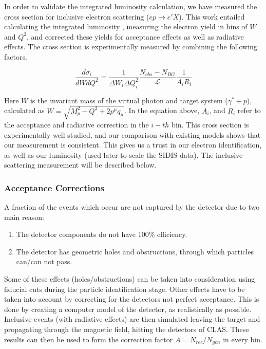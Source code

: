 In order to validate the integrated luminosity calculation, we have measured the cross section for inclusive electron scattering ($ep \rightarrow e'X$).  This work entailed calculating the integrated luminosity \cite{fcup-note}, measuring the electron yield in bins of $W$ and $Q^2$, and corrected these yields for acceptance effects as well as radiative effects.  The cross section is experimentally measured by combining the following factors. 

\begin{equation}
  \frac{d\sigma_i}{dW dQ^2} = \frac{1}{\Delta W_i \Delta Q^2_i} \frac{N_{obs} - N_{BG}}{\mathcal{L}} \frac{1}{A_i R_i}
\end{equation}

Here $W$ is the invariant mass of the virtual photon and target system ($\gamma^* + p$), calculated as $W = \sqrt{M_{p}^{2} - Q^2 + 2{p^\mu} q_{\mu}}$.  In the equation above, $A_i$, and $R_i$ refer to the acceptance and radiative correction in the $i-th$ bin.  This cross section is experimentally well studied, and our comparison with existing models shows that our measurement is consistent.  This gives us a trust in our electron identification, as well as our luminosity (used later to scale the SIDIS data).  The inclusive scattering measurement will be described below.

\subsubsection{Acceptance Corrections}
A fraction of the events which occur are not captured by the detector due to two main reason: 

\begin{enumerate}
  \item The detector components do not have 100\% efficiency.
  \item The detector has geometric holes and obstructions, through which particles can/can not pass.
\end{enumerate}

Some of these effects (holes/obstructions) can be taken into consideration using fiducial cuts during the particle identification stage.  Other effects  have to be taken into account by correcting for the detectors not perfect acceptance.  This is done by creating a computer model of the detector, as realistically as possible.  Inclusive events (with radiative effects) are then simulated leaving the target and propagating through the magnetic field, hitting the detectors of CLAS.  These results can then be used to form the correction factor $A = N_{rec}/N_{gen}$ in every bin.  

